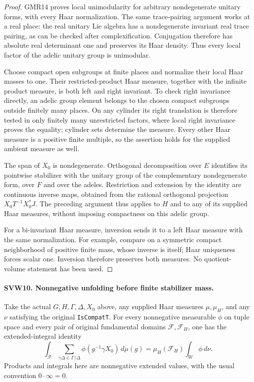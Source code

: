 \begin{proof}
GMR14 proves local unimodularity for arbitrary nondegenerate
unitary forms, with every Haar normalization.  The same trace-pairing
argument works at a real place: the real unitary Lie algebra has a
nondegenerate invariant real trace pairing, as can be checked after
complexification.  Conjugation therefore has absolute real
determinant one and preserves its Haar density.  Thus every local
factor of the adelic unitary group is unimodular.

Choose compact open subgroups at finite places and normalize their
local Haar masses to one.  Their restricted-product Haar measure,
together with the infinite product measure, is both left and right
invariant.  To check right invariance directly, an adelic group
element belongs to the chosen compact subgroups outside finitely
many places.  On any cylinder its right translation is therefore
tested in only finitely many unrestricted factors, where local
right invariance proves the equality; cylinder sets determine the
measure.  Every other Haar measure is a positive finite multiple,
so the assertion holds for the supplied ambient measure as well.

The span of $X_0$ is nondegenerate.  Orthogonal decomposition over
$E$ identifies its pointwise stabilizer with the unitary group of
the complementary nondegenerate form, over $F$ and over the adeles.
Restriction and extension by the identity are continuous inverse
maps, obtained from the rational orthogonal projection
$X_0T^{-1}X_0^*J$.  The preceding argument thus applies to $H$ and
to any of its supplied Haar measures, without imposing compactness
on this adelic group.

For a bi-invariant Haar measure, inversion sends it to a left Haar
measure with the same normalization.  For example, compare on a
symmetric compact neighborhood of positive finite mass, whose
inverse is itself; Haar uniqueness forces scalar one.  Inversion
therefore preserves both measures.  No quotient-volume statement
has been used.
\end{proof}

\paragraph{SVW10. Nonnegative unfolding before finite stabilizer mass.}
\label{claim:SVW10}
Take the actual $G,H,\Gamma,\Delta,X_0$ above, any supplied Haar
measures $\mu,\mu_H$, and any $\nu$ satisfying the original
\texttt{IsCompatT}.  For every nonnegative measurable $\phi$ on
tuple space and every pair of original fundamental domains
$\mathcal F,\mathcal F_H$, one has the extended-integral identity
\[
 \int_{\mathcal F}\sum_{\gamma\Delta\in\Gamma/\Delta}
               \phi(g^{-1}\gamma X_0)\,d\mu(g)
             =\mu_H(\mathcal F_H)\int_W\phi\,d\nu.
 \tag{SVW.18}
\]
Products and integrals here are nonnegative extended values,
with the usual convention $0\cdot\infty=0$.

